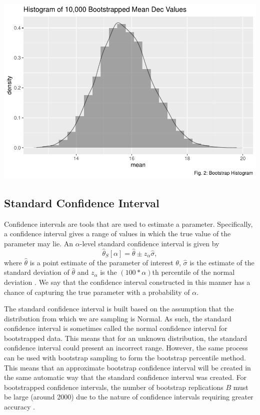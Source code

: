 \documentclass[12pt]{article}
\begin{document}
\includegraphics{paper_files/figure-latex/unnamed-chunk-3-1.pdf}

\hypertarget{standard-confidence-interval}{%
\subsection{Standard Confidence
Interval}\label{standard-confidence-interval}}

Confidence intervals are tools that are used to estimate a parameter.
Specifically, a confidence interval gives a range of values in which the
true value of the parameter may lie. An \(\alpha\)-level standard
confidence interval is given by
\[\hat{\theta}_S[\alpha] = \hat{\theta} \pm z_{\alpha}\hat{\sigma},\]
where \(\hat{\theta}\) is a point estimate of the parameter of interest
\(\theta\), \(\hat{\sigma}\) is the estimate of the standard deviation
of \(\hat{\theta}\) and \(z_{\alpha}\) is the \((100 *\alpha)\)th
percentile of the normal deviation \citep{Efron86}. We say that the
confidence interval constructed in this manner has a chance of capturing
the true parameter with a probability of \(\alpha\).

The standard confidence interval is built based on the assumption that
the distribution from which we are sampling is Normal. As such, the
standard confidence interval is sometimes called the normal confidence
interval for bootstrapped data. This means that for an unknown
distribution, the standard confidence interval could present an
incorrect range. However, the same process can be used with bootstrap
sampling to form the bootstrap percentile method. This means that an
approximate bootstrap confidence interval will be created in the same
automatic way that the standard confidence interval was created. For
bootstrapped confidence intervals, the number of bootstrap replications
\(B\) must be large (around 2000) due to the nature of confidence
intervals requiring greater accuracy \citep{Efron86}.
\end{document}
